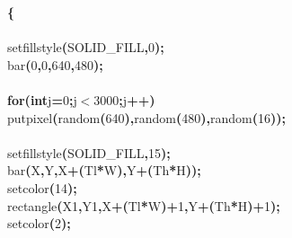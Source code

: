 \documentclass[a4paper, 10pt]{article}
\newcommand\SPC{\hspace*{0.6em}}
\newcommand\HYP{\mbox{\char 45}}
\newcommand{\CppAIdentifier}[1]{#1}
\newcommand{\CppANumber}[1]{\textcolor[rgb]{0.5,0,0.5}{#1}}
\newcommand{\CppAReservedWord}[1]{\textbf{#1}}
\newcommand{\CppASpace}[1]{\colorbox[rgb]{1,1,1}{#1}}
\newcommand{\CppASymbol}[1]{\textbf{\textcolor[rgb]{1,0,0}{#1}}}
\begin{document}
\begin{ttfamily}
\CppASymbol{\{}\\
\\
\CppASpace{\SPC }\CppAIdentifier{setfillstyle}\CppASymbol{(}\CppAIdentifier{SOLID\_FILL}\CppASymbol{,}\CppANumber{0}\CppASymbol{)}\CppASymbol{;}\\
\CppASpace{\SPC }\CppAIdentifier{bar}\CppASymbol{(}\CppANumber{0}\CppASymbol{,}\CppANumber{0}\CppASymbol{,}\CppANumber{640}\CppASymbol{,}\CppANumber{480}\CppASymbol{)}\CppASymbol{;}\\
\\
\CppASpace{\SPC }\CppAReservedWord{for}\CppASymbol{(}\CppAReservedWord{int}\CppASpace{\SPC }\CppAIdentifier{j}\CppASymbol{=}\CppANumber{0}\CppASymbol{;}\CppAIdentifier{j}\CppASymbol{$<$}\CppANumber{3000}\CppASymbol{;}\CppAIdentifier{j}\CppASymbol{++}\CppASymbol{)}\\
\CppASpace{\SPC \SPC \SPC }\CppAIdentifier{putpixel}\CppASymbol{(}\CppAIdentifier{random}\CppASymbol{(}\CppANumber{640}\CppASymbol{)}\CppASymbol{,}\CppAIdentifier{random}\CppASymbol{(}\CppANumber{480}\CppASymbol{)}\CppASymbol{,}\CppAIdentifier{random}\CppASymbol{(}\CppANumber{16}\CppASymbol{)}\CppASymbol{)}\CppASymbol{;}\\
\\
\CppASpace{\SPC }\CppAIdentifier{setfillstyle}\CppASymbol{(}\CppAIdentifier{SOLID\_FILL}\CppASymbol{,}\CppANumber{15}\CppASymbol{)}\CppASymbol{;}\\
\CppASpace{\SPC }\CppAIdentifier{bar}\CppASymbol{(}\CppAIdentifier{X}\CppASymbol{,}\CppAIdentifier{Y}\CppASymbol{,}\CppAIdentifier{X}\CppASymbol{+}\CppASymbol{(}\CppAIdentifier{Tl}\CppASymbol{*}\CppAIdentifier{W}\CppASymbol{)}\CppASymbol{,}\CppAIdentifier{Y}\CppASymbol{+}\CppASymbol{(}\CppAIdentifier{Th}\CppASymbol{*}\CppAIdentifier{H}\CppASymbol{)}\CppASymbol{)}\CppASymbol{;}\\
\CppASpace{\SPC }\CppAIdentifier{setcolor}\CppASymbol{(}\CppANumber{14}\CppASymbol{)}\CppASymbol{;}\\
\CppASpace{\SPC }\CppAIdentifier{rectangle}\CppASymbol{(}\CppAIdentifier{X}\CppASymbol{\HYP }\CppANumber{1}\CppASymbol{,}\CppAIdentifier{Y}\CppASymbol{\HYP }\CppANumber{1}\CppASymbol{,}\CppAIdentifier{X}\CppASymbol{+}\CppASymbol{(}\CppAIdentifier{Tl}\CppASymbol{*}\CppAIdentifier{W}\CppASymbol{)}\CppASymbol{+}\CppANumber{1}\CppASymbol{,}\CppAIdentifier{Y}\CppASymbol{+}\CppASymbol{(}\CppAIdentifier{Th}\CppASymbol{*}\CppAIdentifier{H}\CppASymbol{)}\CppASymbol{+}\CppANumber{1}\CppASymbol{)}\CppASymbol{;}\\
\CppASpace{\SPC }\CppAIdentifier{setcolor}\CppASymbol{(}\CppANumber{2}\CppASymbol{)}\CppASymbol{;}\\

\end{ttfamily}
\end{document}
